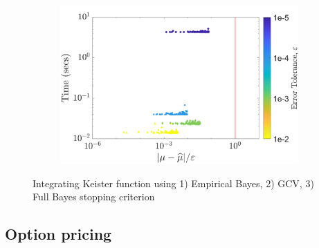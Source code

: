 \documentclass[10pt,compress,xcolor={usenames,dvipsnames}]{beamer} %
\begin{document}
{\begin{figure}[htp]
\begin{subfigure}[b]{0.43\textwidth}
    \end{subfigure}
    \centering
    \begin{subfigure}[b]{0.43\textwidth}
    \includegraphics[width=\textwidth]{"Keister_guaranteed_time_full_C1sin_d4_r2_2018-Sep-6"}
    \end{subfigure}
   \caption{Integrating Keister function using 1) Empirical Bayes, 2) GCV, 3) Full Bayes stopping criterion}
\end{figure}
}



\subsection{Option pricing}
\end{document}
